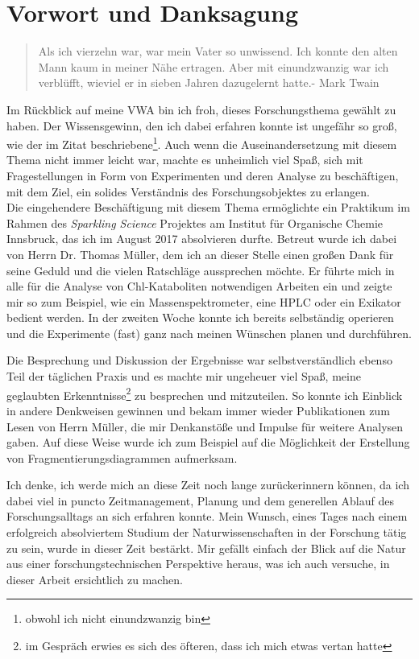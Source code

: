 \chapter*{Vorwort und Danksagung}
\label{cha:Vorwort}

\begin{quotation}
\glqq Als ich vierzehn war, war mein Vater so unwissend. Ich konnte den alten Mann kaum in meiner Nähe ertragen. Aber mit einundzwanzig war ich verblüfft, wieviel er in sieben Jahren dazugelernt hatte.\grqq - Mark Twain
\end{quotation}

Im Rückblick auf meine VWA bin ich froh, dieses Forschungsthema gewählt zu haben. Der Wissensgewinn, den ich dabei erfahren konnte ist ungefähr so groß, wie der im Zitat beschriebene\footnote{obwohl ich nicht einundzwanzig bin}. Auch wenn die Auseinandersetzung mit diesem Thema nicht immer leicht war, machte es unheimlich viel Spaß, sich mit Fragestellungen in Form von Experimenten und deren Analyse zu beschäftigen, mit dem Ziel, ein solides Verständnis des Forschungsobjektes zu erlangen.\\

Die eingehendere Beschäftigung mit diesem Thema ermöglichte ein Praktikum im Rahmen des \textit{Sparkling Science} Projektes am Institut für Organische Chemie Innsbruck, das ich im August 2017 absolvieren durfte. Betreut wurde ich dabei von Herrn Dr. Thomas Müller, dem ich an dieser Stelle einen großen Dank für seine Geduld und die vielen Ratschläge aussprechen möchte. Er führte mich in alle für die Analyse von Chl-Kataboliten notwendigen Arbeiten ein und zeigte mir so zum Beispiel, wie ein Massenspektrometer, eine HPLC oder ein Exikator bedient werden. In der zweiten Woche konnte ich bereits selbständig operieren und die Experimente (fast) ganz nach meinen Wünschen planen und durchführen. 

Die Besprechung und Diskussion der Ergebnisse war selbstverständlich ebenso Teil der täglichen Praxis und es machte mir ungeheuer viel Spaß, meine geglaubten Erkenntnisse\footnote{im Gespräch erwies es sich des öfteren, dass ich mich etwas vertan hatte} zu besprechen und mitzuteilen. So konnte ich Einblick in andere Denkweisen gewinnen und bekam immer wieder Publikationen zum Lesen von Herrn Müller, die mir Denkanstöße und Impulse für weitere Analysen gaben. Auf diese Weise wurde ich zum Beispiel auf die Möglichkeit der Erstellung von Fragmentierungsdiagrammen aufmerksam. 

Ich denke, ich werde mich an diese Zeit noch lange zurückerinnern können, da ich dabei viel in puncto Zeitmanagement, Planung und dem generellen Ablauf des Forschungsalltags an sich erfahren konnte. Mein Wunsch, eines Tages nach einem erfolgreich absolviertem Studium der Naturwissenschaften in der Forschung tätig zu sein, wurde in dieser Zeit bestärkt. Mir gefällt einfach der Blick auf die Natur aus einer forschungstechnischen Perspektive heraus, was ich auch versuche, in dieser Arbeit ersichtlich zu machen.\\

